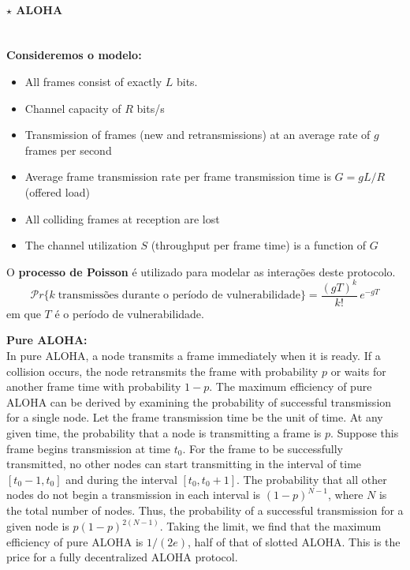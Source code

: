 \paragraph[5.3.2.1 ALOHA]{$\pmb{\star}$ ALOHA}\mbox{}\\[4pt]
\noindent \textbf{Consideremos o modelo:}
\begin{itemize}[nolistsep,noitemsep] \small
    \item All frames consist of exactly $L$ bits.
    \item Channel capacity of $R$ bits/s
    \item Transmission of frames (new and retransmissions) at an average rate of $g$ frames per second
    \item Average frame transmission rate per frame transmission time is $G = g L/R$ (offered load)
    \item All colliding frames at reception are lost
    \item The channel utilization $S$ (throughput per frame time) is a function of $G$
\end{itemize}

\vspace{1em}
\noindent O \textbf{processo de Poisson} é utilizado para modelar as interações deste protocolo.
$$
    \mathcal{P}r\{k\; \text{transmissões durante o período de vulnerabilidade}\} = \frac{(gT)^k}{k!}\, e^{-gT}
$$
em que $T$ é o período de vulnerabilidade.

\vspace{1em}
\noindent \textbf{Pure ALOHA:}\\[2pt]
In pure ALOHA, a node transmits a frame immediately when it is ready. If a collision occurs, the node retransmits the frame with probability $p$ or waits for another frame time with probability $1-p$. The maximum efficiency of pure ALOHA can be derived by examining the probability of successful transmission for a single node. Let the frame transmission time be the unit of time. At any given time, the probability that a node is transmitting a frame is $p$. Suppose this frame begins transmission at time $t_0$. For the frame to be successfully transmitted, no other nodes can start transmitting in the interval of time $[t_0 - 1, t_0]$ and during the interval $[t_0, t_0 + 1]$. The probability that all other nodes do not begin a transmission in each interval is $(1 - p)^{N-1}$, where $N$ is the total number of nodes. Thus, the probability of a successful transmission for a given node is $p(1 - p)^{2(N-1)}$. Taking the limit, we find that the maximum efficiency of pure ALOHA is $1/(2e)$, half of that of slotted ALOHA. This is the price for a fully decentralized ALOHA protocol.

